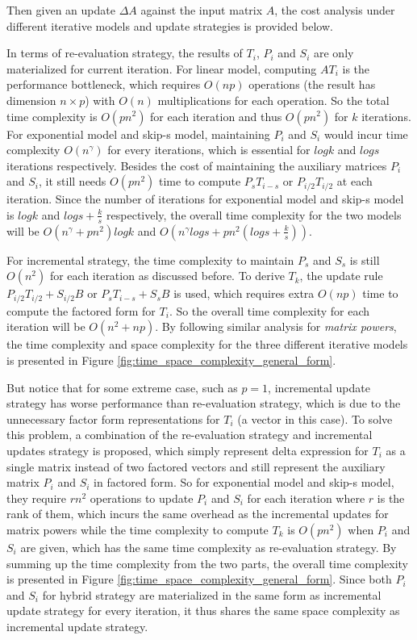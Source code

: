 Then given an update $\Delta A$ against the input matrix $A$, the cost analysis under different iterative models and update strategies is provided below.

In terms of re-evaluation strategy, the results of $T_i$, $P_i$ and $S_i$ are only materialized for current iteration. For linear model, computing $AT_i$ is the performance bottleneck, which requires $O(np)$ operations (the result has dimension $n \times p$) with $O(n)$ multiplications for each operation. So the total time complexity is $O(pn^2)$ for each iteration and thus $O(pn^2)$ for $k$ iterations. For exponential model and skip-s model, maintaining $P_i$ and $S_i$ would incur time complexity $O(n^{\gamma})$ for every iterations, which is essential for $logk$ and $logs$ iterations respectively. Besides the cost of maintaining the auxiliary matrices $P_i$ and $S_i$, it still needs $O(pn^2)$ time to compute $P_sT_{i-s}$ or $P_{i/2}T_{i/2}$ at each iteration. Since the number of iterations for exponential model and skip-s model is $logk$ and $logs + \frac{k}{s}$ respectively, the overall time complexity for the two models will be $O(n^{\gamma} + pn^2)logk$ and $O(n^{\gamma}logs + pn^2(logs+ \frac{k}{s}))$.

For incremental strategy, the time complexity to maintain $P_s$ and $S_s$ is still $O(n^2)$ for each iteration as discussed before. To derive $T_k$, the update rule $P_{i/2}T_{i/2} + S_{i/2}B$ or $P_sT_{i-s} + S_sB$ is used, which requires extra $O(np)$ time to compute the factored form for $T_i$. So the overall time complexity for each iteration will be $O(n^2 + np)$. By following similar analysis for {\em matrix powers}, the time complexity and space complexity for the three different iterative models is presented in Figure \ref{fig:time_space_complexity_general_form}.

But notice that for some extreme case, such as $p=1$, incremental update strategy has worse performance than re-evaluation strategy, which is due to the unnecessary factor form representations for $T_i$ (a vector in this case). To solve this problem, a combination of the re-evaluation strategy and incremental updates strategy is proposed, which simply represent delta expression for $T_i$ as a single matrix instead of two factored vectors and still represent the auxiliary matrix $P_i$ and $S_i$ in factored form. So for exponential model and skip-s model, they require $rn^2$ operations to update $P_i$ and $S_i$ for each iteration where $r$ is the rank of them, which incurs the same overhead as the incremental updates for matrix powers while the time complexity to compute $T_k$ is $O(pn^2)$ when $P_i$ and $S_i$ are given, which has the same time complexity as re-evaluation strategy. By summing up the time complexity from the two parts, the overall time complexity is presented in Figure \ref{fig:time_space_complexity_general_form}. Since both $P_i$ and $S_i$ for hybrid strategy are materialized in the same form as incremental update strategy for every iteration, it thus shares the same space complexity as incremental update strategy.


